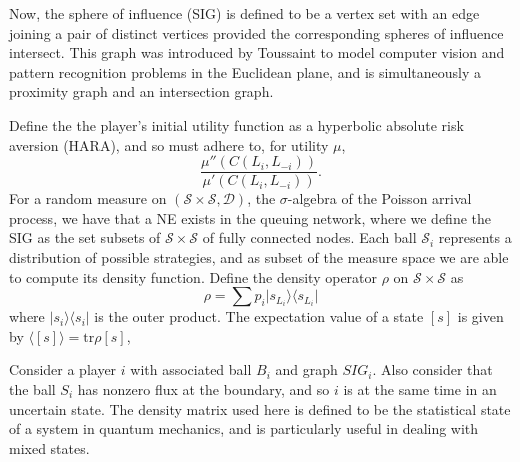 \documentclass[10pt]{article}
\newcommand{\mcS}{\mathcal{S}}
\newcommand{\mcD}{\mathcal{D}}
\theoremstyle{definition}
\begin{document}
Now, the sphere of influence (SIG) is defined to be a vertex set with an edge joining
a pair of distinct vertices provided the corresponding spheres of influence intersect. This graph was introduced by Toussaint to model computer vision and pattern recognition problems in the
Euclidean plane, and is simultaneously a proximity graph and an intersection graph.

Define the the player's initial utility
function as a hyperbolic absolute risk aversion (HARA), and so must adhere to,
for utility $\mu$,
$$
    \displaystyle\frac{\mu''(C(L_i,L_{-i}))}{\mu'(C(L_i,L_{-i}))}.
$$
For a random measure on $(\mcS \times \mcS, \mcD)$, the $\sigma$-algebra of the
Poisson arrival process, we have that a NE exists in the queuing network, where we define the SIG as the set subsets of $\mcS\times\mcS$ of fully connected nodes.
Each ball $\mcS_i$ represents a distribution of possible strategies, and as subset of the
measure space we are able to compute its density function. 
Define the density operator $\rho$ on $\mcS\times \mcS$ as
$$
    \rho = \displaystyle\sum p_i\vert s_{L_i}\rangle\langle s_{L_i}\vert
$$
where $\vert s_i\rangle\langle s_i\vert$ is the outer product. The expectation
value of a state $[s]$ is given by $\langle [s] \rangle = \text{tr}{\rho [s]}$,

Consider a player $i$ with associated ball $B_i$ and graph $SIG_i$. Also consider that the ball $S_i$ has nonzero flux
at the boundary, and so $i$ is at the same time in an uncertain state. The
density matrix used here is defined to be the statistical state of a system in
quantum mechanics, and is particularly useful in dealing with mixed states.
\end{document}
